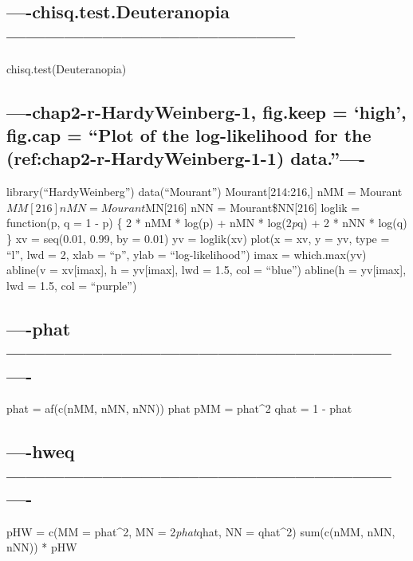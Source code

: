 \documentclass[]{article}
\begin{document}
\subsection{----chisq.test.Deuteranopia---------------------------------------------}\label{chisq.test.deuteranopia}

chisq.test(Deuteranopia)

\subsection{\texorpdfstring{----chap2-r-HardyWeinberg-1, fig.keep =
`high', fig.cap = ``Plot of the log-likelihood for the
(ref:chap2-r-HardyWeinberg-1-1)
data.''----}{----chap2-r-HardyWeinberg-1, fig.keep = high, fig.cap = Plot of the log-likelihood for the (ref:chap2-r-HardyWeinberg-1-1) data.----}}\label{chap2-r-hardyweinberg-1-fig.keep-high-fig.cap-plot-of-the-log-likelihood-for-the-refchap2-r-hardyweinberg-1-1-data.-}

library(``HardyWeinberg'') data(``Mourant'') Mourant{[}214:216,{]} nMM =
Mourant\(MM[216] nMN = Mourant\)MN{[}216{]} nNN = Mourant\$NN{[}216{]}
loglik = function(p, q = 1 - p) \{ 2 * nMM * log(p) + nMN *
log(2\emph{p}q) + 2 * nNN * log(q) \} xv = seq(0.01, 0.99, by = 0.01) yv
= loglik(xv) plot(x = xv, y = yv, type = ``l'', lwd = 2, xlab = ``p'',
ylab = ``log-likelihood'') imax = which.max(yv) abline(v = xv{[}imax{]},
h = yv{[}imax{]}, lwd = 1.5, col = ``blue'') abline(h = yv{[}imax{]},
lwd = 1.5, col = ``purple'')

\subsection{----phat----------------------------------------------------------------}\label{phat-}

phat = af(c(nMM, nMN, nNN)) phat pMM = phat\^{}2 qhat = 1 - phat

\subsection{----hweq----------------------------------------------------------------}\label{hweq-}

pHW = c(MM = phat\^{}2, MN = 2\emph{phat}qhat, NN = qhat\^{}2)
sum(c(nMM, nMN, nNN)) * pHW
\end{document}
